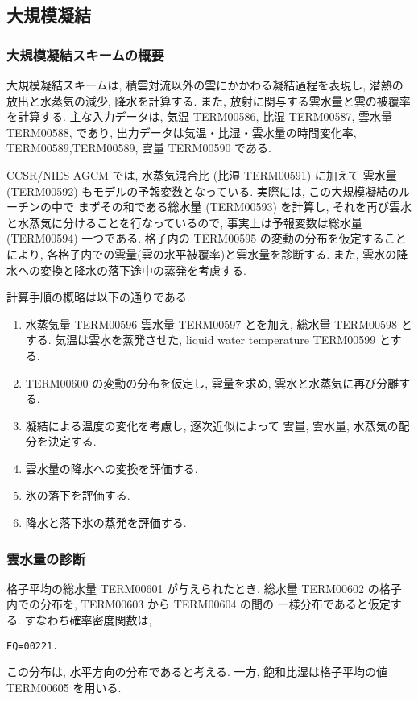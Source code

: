 ﻿
\subsection{大規模凝結}

\subsubsection{大規模凝結スキームの概要}

大規模凝結スキームは,
積雲対流以外の雲にかかわる凝結過程を表現し,
潜熱の放出と水蒸気の減少, 降水を計算する.
また, 放射に関与する雲水量と雲の被覆率を計算する.
主な入力データは, 気温 TERM00586, 比湿 TERM00587, 雲水量 TERM00588, であり,
出力データは気温・比湿・雲水量の時間変化率,
TERM00589,TERM00589,
雲量 TERM00590 である.

CCSR/NIES AGCM では, 水蒸気混合比 (比湿 TERM00591) に加えて
雲水量 (TERM00592) もモデルの予報変数となっている.
実際には, この大規模凝結のルーチンの中で
まずその和である総水量 (TERM00593) を計算し, 
それを再び雲水と水蒸気に分けることを行なっているので,
事実上は予報変数は総水量 (TERM00594) 一つである.
格子内の TERM00595 の変動の分布を仮定することにより,
各格子内での雲量(雲の水平被覆率)と雲水量を診断する.
また, 雲水の降水への変換と降水の落下途中の蒸発を考慮する.

計算手順の概略は以下の通りである.
%
\begin{enumerate}
\item 水蒸気量 TERM00596 雲水量 TERM00597 とを加え,
      総水量 TERM00598 とする.
      気温は雲水を蒸発させた, 
      liquid water temperature  TERM00599 とする.
\item TERM00600 の変動の分布を仮定し,
      雲量を求め, 雲水と水蒸気に再び分離する.
\item 凝結による温度の変化を考慮し,
      逐次近似によって
      雲量, 雲水量, 水蒸気の配分を決定する.
\item 雲水量の降水への変換を評価する.
\item 氷の落下を評価する.
\item 降水と落下氷の蒸発を評価する.
\end{enumerate}

\subsubsection{雲水量の診断}

格子平均の総水量 TERM00601 が与えられたとき,
総水量 TERM00602 の格子内での分布を,
TERM00603 から TERM00604 の間の
一様分布であると仮定する. すなわち確率密度関数は,
\begin{verbatim}
EQ=00221.
\end{verbatim}
この分布は, 水平方向の分布であると考える.
一方, 飽和比湿は格子平均の値 TERM00605 を用いる.

